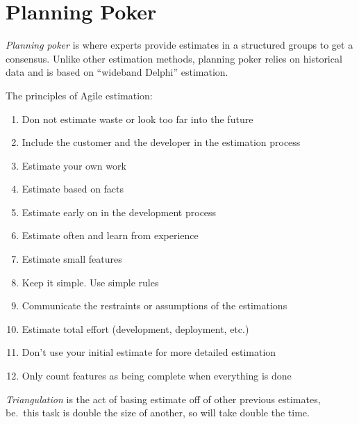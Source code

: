 \section{Planning Poker}\label{sec:planning_poker}

\emph{Planning poker} is where experts provide estimates in a structured groups to get a consensus.
Unlike other estimation methods, planning poker relies on historical data and is based on ``wideband Delphi'' estimation.

The principles of Agile estimation:
\begin{enumerate}
	\item Don not estimate waste or look too far into the future
	\item Include the customer and the developer in the estimation process
	\item Estimate your own work
	\item Estimate based on facts
	\item Estimate early on in the development process
	\item Estimate often and learn from experience
	\item Estimate small features
	\item Keep it simple. Use simple rules
	\item Communicate the restraints or assumptions of the estimations
	\item Estimate total effort (development, deployment, etc.)
	\item Don't use your initial estimate for more detailed estimation
	\item Only count features as being complete when everything is done
\end{enumerate}
%
\emph{Triangulation} is the act of basing estimate off of other previous estimates, be.\ this task is double the size of another, so will take double the time.

